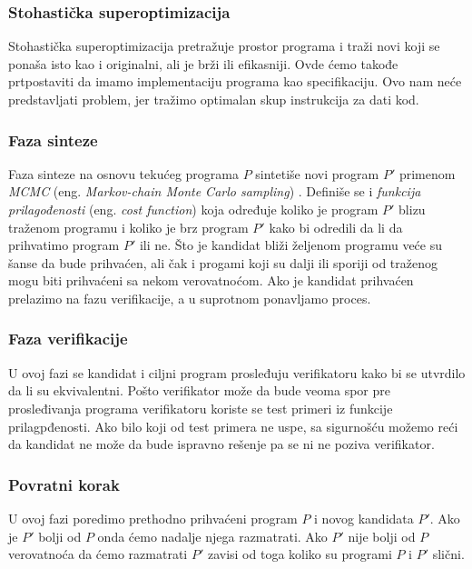 \subsubsection{Stohastička superoptimizacija}
\label{subsec:StohastickaSuperoptimizacija}

Stohastička superoptimizacija pretražuje prostor programa i traži novi koji se ponaša isto kao i originalni, ali je brži ili efikasniji. Ovde ćemo takođe prtpostaviti da imamo implementaciju programa kao specifikaciju. Ovo nam neće predstavljati problem, jer tražimo optimalan skup instrukcija za dati kod.


\subsubsection*{Faza sinteze}


Faza sinteze na osnovu tekućeg programa $P$ sintetiše novi program $P'$ primenom \emph{MCMC} (eng. \emph{Markov-chain Monte Carlo sampling}) \cite{MCMC}. Definiše se i \emph{funkcija prilagođenosti} (eng. \emph{cost function}) koja određuje koliko je program $P'$ blizu traženom programu i koliko je brz program $P'$ kako bi odredili da li da prihvatimo program $P'$ ili ne. Što je kandidat bliži željenom programu veće su šanse da bude prihvaćen, ali čak i progami koji su dalji ili sporiji od traženog mogu biti prihvaćeni sa nekom verovatnoćom. Ako je kandidat prihvaćen prelazimo na fazu verifikacije, a u suprotnom ponavljamo proces.


\subsubsection*{Faza verifikacije}


U ovoj fazi se kandidat i ciljni program prosleđuju verifikatoru kako bi se utvrdilo da li su ekvivalentni. Pošto verifikator može da bude veoma spor pre prosleđivanja programa verifikatoru koriste se test primeri iz funkcije prilagpđenosti. Ako bilo koji od test primera ne uspe, sa sigurnošću možemo reći da kandidat ne može da bude ispravno rešenje pa se ni ne poziva verifikator.


\subsubsection*{Povratni korak}

U ovoj fazi poredimo prethodno prihvaćeni program $P$ i novog kandidata $P'$. Ako je $P'$ bolji od $P$ onda ćemo nadalje njega razmatrati. Ako $P'$ nije bolji od $P$ verovatnoća da ćemo razmatrati $P'$ zavisi od toga koliko su programi $P$ i $P'$ slični.



